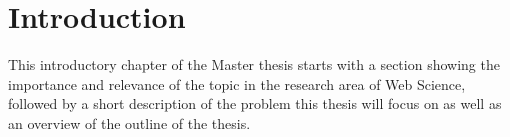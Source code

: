 
\chapter{Introduction} %
\label{cha:introduction}

This introductory chapter of the Master thesis starts with a section showing the importance and relevance of the topic in the research area of Web Science, followed by a short description of the problem this thesis will focus on as well as an overview of the outline of the thesis.







